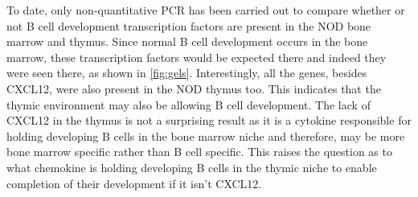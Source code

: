 To date, only non-quantitative PCR has been carried out to compare whether or not B cell development transcription factors are present in the NOD bone marrow and thymus.
Since normal B cell development occurs in the bone marrow, these transcription factors would be expected there and indeed they were seen there, as shown in \cref{fig:gels}. 
Interestingly, all the genes, besides CXCL12, were also present in the NOD thymus too.
This indicates that the thymic environment may also be allowing B cell development.
The lack of CXCL12 in the thymus is not a surprising result as it is a cytokine responsible for holding developing B cells in the bone marrow niche and therefore, may be more bone marrow specific rather than B cell specific.
This raises the question as to what chemokine is holding developing B cells in the thymic niche to enable completion of their development if it isn't CXCL12.


